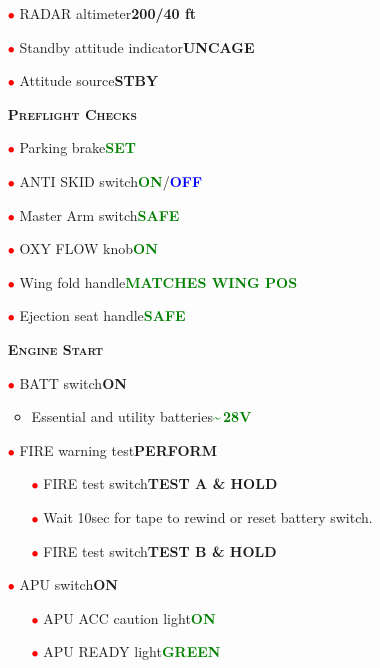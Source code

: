 \documentclass[a4paper,12pt,dvipsnames]{letter}
\newcommand{\button}[1]{\textbf{#1}}
\newcommand{\ok}[1]{\textcolor{Green}{\textbf{#1}}}
\newcommand{\boat}[1]{\textcolor{Blue}{\textbf{#1}}}
\newcommand{\myHead}[1]{{\LARGE\textsc{\textbf{#1}}}}
\newcommand{\ri}{\textcolor{red}{$\bullet$\;}}
\begin{document}
{\begin{itemize}
 \item[\ri] RADAR altimeter\dotfill\button{200/40 ft}
 \item[\ri] Standby attitude indicator\dotfill\button{UNCAGE}
 \item[\ri] Attitude source\dotfill\button{STBY}
\end{itemize}
\newpage
\begin{itemize}
 \item[] \myHead{Preflight Checks}
 \item[\ri] Parking brake\dotfill\ok{SET}
 \item[\ri] ANTI SKID switch\dotfill\ok{ON}/\boat{OFF}
 \item[\ri] Master Arm switch\dotfill\ok{SAFE}
 \item[\ri] OXY FLOW knob\dotfill\ok{ON}
 \item[\ri] Wing fold handle\dotfill\ok{MATCHES WING POS}
 \item[\ri] Ejection seat handle\dotfill\ok{SAFE}
\end{itemize}
\begin{itemize}
 \item[] \myHead{Engine Start} 
 \item[\ri] BATT switch\dotfill\button{ON}
 \begin{itemize}
  \item Essential and utility batteries\dotfill\ok{\textasciitilde\,28\;V}
 \end{itemize}
 \item[\ri] FIRE warning test\dotfill\button{PERFORM}
 \begin{itemize}
  \item[\ri] FIRE test switch\dotfill\button{TEST A \& HOLD}
  \item[\ri] Wait 10\;sec for tape to rewind or reset battery switch.
  \item[\ri] FIRE test switch\dotfill\button{TEST B \& HOLD}
 \end{itemize}
 \item[\ri] APU switch\dotfill\button{ON}
 \begin{itemize}
  \item[\ri] APU ACC caution light\dotfill\ok{ON}
  \item[\ri] APU READY light\dotfill\ok{GREEN}

\end{itemize}
\end{itemize}}
\end{document}
